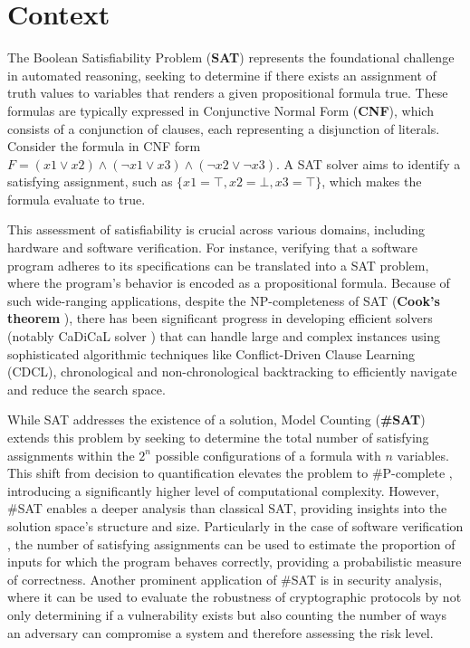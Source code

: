 \documentclass{report}
\begin{document}
\newpage
\onehalfspacing
\hypersetup{pageanchor=true}
\tableofcontents
\newpage
\chapter{Context}
The Boolean Satisfiability Problem (\textbf{SAT}) represents 
the foundational challenge in automated reasoning, 
seeking to determine if there exists an assignment of truth values 
to variables that renders a given propositional formula true. 
These formulas are typically expressed in Conjunctive Normal Form (\textbf{CNF}), 
which consists of a conjunction of clauses, each representing a disjunction of literals.
Consider the formula in CNF form $F = (x1 \lor x2) \land (\lnot x1 \lor x3) \land (\lnot x2 \lor \lnot x3)$.
A SAT solver aims to identify a satisfying assignment, such as ${\{x1 = \top, x2 = \bot, x3 = \top\}}$,
which makes the formula evaluate to true.

This assessment of satisfiability is crucial across various domains, including hardware and software verification\cite{sat-software-verif}.
For instance, verifying that a software program adheres to its specifications 
can be translated into a SAT problem, where the program's behavior is encoded as a propositional formula. 
Because of such wide-ranging applications, despite the NP-completeness of SAT (\textbf{Cook's theorem} \cite{Cook-theorem}), there has been significant progress in developing efficient 
solvers (notably CaDiCaL solver \cite{cadical}) that can handle large and complex instances using sophisticated algorithmic techniques like Conflict-Driven Clause Learning (CDCL), 
chronological and non-chronological backtracking \cite{chrono-sat} to efficiently navigate and reduce the search space.

While SAT addresses the existence of a solution, Model Counting (\textbf{\#SAT}) extends this problem by
seeking to determine the total number of satisfying assignments 
within the $2^n$ possible configurations of a formula with $n$ variables.
This shift from decision to quantification elevates the problem to \#P-complete \cite{count-sat-handbook}, introducing
a significantly higher level of computational complexity. However, \#SAT enables a deeper analysis than classical SAT,
providing insights into the solution space's structure and size. Particularly in the case of software verification \cite{model-counting-software},
the number of satisfying assignments can be used to estimate the proportion of inputs for which the program
behaves correctly, providing a probabilistic measure of correctness. 
Another prominent application of \#SAT is in security analysis, 
where it can be used to evaluate the robustness of cryptographic protocols \cite{security26}
by not only determining if a vulnerability exists but also
counting the number of ways an adversary can compromise a system and therefore assessing the risk level.
\end{document}
